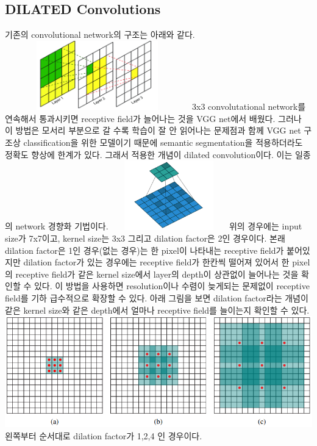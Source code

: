 \documentclass[extendedabs]{bmvc2k}
\begin{document}
 \subsection{DILATED Convolutions\cite{yu2015multi}}
 \quad 기존의 convolutional network의 구조는 아래와 같다. 
 \newline  \includegraphics[width=8cm, height=3cm]{images/04_D.PNG}  
 \newline 3x3 convolutational network를 연속해서 통과시키면 receptive field가 늘어나는 것을 VGG net에서 배웠다.
 그러나 이 방법은 모서리 부분으로 갈 수록 학습이 잘 안 읽어나는 문제점과 함께 VGG net 구조상 classification을 위한 모델이기 때문에
 semantic segmentation을 적용하더라도 정확도 향상에 한계가 있다. 그래서 적용한 개념이 dilated convolution이다. 
 이는 일종의 network 경향화 기법\cite{youtube}이다.
 \newline  \includegraphics[width=5cm, height=3cm]{images/03_D.PNG}  
 \newline 위의 경우에는 input size가 7x7이고, kernel size는 3x3 그리고 dilation factor은 2인 경우이다.
 본래 dilation factor은 1인 경우(없는 경우)는 한 pixel이 나타내는 receptive field가 붙어있지만 dilation factor가 있는 경우에는 
 receptive field가 한칸씩 떨어져 있어서 한 pixel의 receptive field가 같은 kernel size에서 layer의 depth이 상관없이 늘어나는 것을 확인할 수 있다.
 이 방법을 사용하면 resolution이나 수렴이 늦게되는 문제없이 receptive field를 기하 급수적으로 확장할 수 있다.
 아래 그림을 보면 dilation factor라는 개념이 같은 kernel size와 같은 depth에서 얼마나 receptive field를 늘이는지 확인할 수 있다.
 \newline  \includegraphics[width=\linewidth]{images/05_D.PNG}
 왼쪽부터 순서대로 dilation factor가 1,2,4 인 경우이다.
\end{document}

